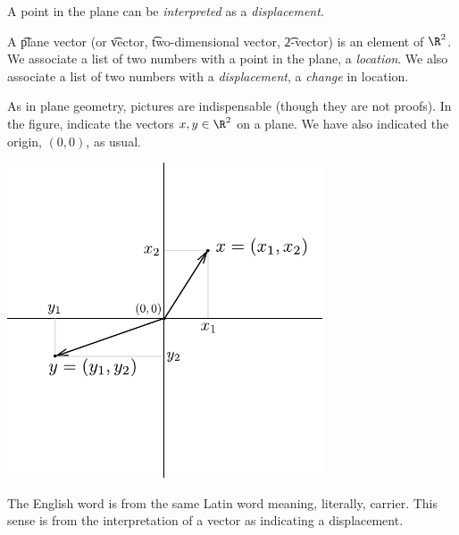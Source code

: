 
A point in the plane can be \textit{interpreted} as a \textit{displacement}.

A \t{plane vector} (or \t{vector}, \t{two-dimensional vector}, \t{2-vector}) is an element of $\R^2$.
We associate a list of two numbers with a point in the plane, a \textit{location}.
We also associate a list of two numbers with a \textit{displacement}, a \textit{change} in location.

As in plane geometry, pictures are indispensable (though they are not proofs).
In the figure, indicate the vectors $x, y \in \R^2$ on a plane.
We have also indicated the origin, $(0, 0)$, as usual.
\begin{center}
\includegraphics[width=0.7\textwidth]{graphics/vector_components}
\end{center}

The English word  is from the same Latin word  meaning, literally, carrier.
This sense is from the interpretation of a vector as indicating a displacement.

